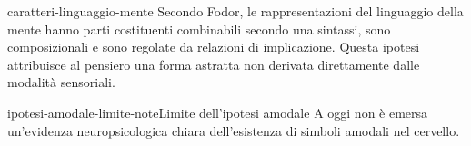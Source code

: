 \documentclass[preview]{standalone}
\begin{document}
\begin{snippet}{caratteri-linguaggio-mente}
    Secondo Fodor, le rappresentazioni del linguaggio della mente hanno parti
    costituenti combinabili secondo una sintassi, sono composizionali e sono
    regolate da relazioni di implicazione. Questa ipotesi attribuisce al
    pensiero una forma astratta non derivata direttamente dalle modalità
    sensoriali.
\end{snippet}

\begin{snippetnote}{ipotesi-amodale-limite-note}{Limite dell'ipotesi amodale}
    A oggi non è emersa un'evidenza neuropsicologica chiara dell'esistenza di
    simboli amodali nel cervello.
\end{snippetnote}
\end{document}
